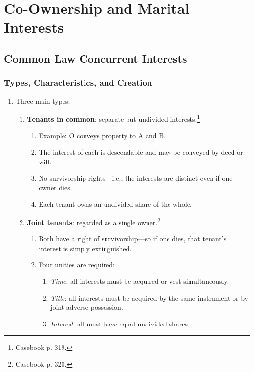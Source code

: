 \section{Co-Ownership and Marital Interests}

\subsection{Common Law Concurrent Interests}

\subsubsection{Types, Characteristics, and Creation}

\begin{enumerate}
    \item Three main types:
    \begin{enumerate}
        \item \textbf{Tenants in common}: separate but undivided 
        interests.\footnote{Casebook p. 319.}
        \begin{enumerate}
            \item Example: O conveys property to A and B.
            \item The interest of each is descendable and may be conveyed by 
            deed or will.
            \item No survivorship rights---i.e., the interests are distinct 
            even if one owner dies.
            \item Each tenant owns an undivided share of the whole.
        \end{enumerate}
        \item \textbf{Joint tenants}: regarded as a single 
        owner.\footnote{Casebook p. 320.}
        \begin{enumerate}
            \item Both have a right of survivorship---so if one dies, that 
            tenant's interest is simply extinguished.
            \item Four unities are required:
            \begin{enumerate}
                \item \emph{Time}: all interests must be acquired or vest 
                simultaneously.
                \item \emph{Title}: all interests must be acquired by the same 
                instrument or by joint adverse possession.
                \item \emph{Interest}: all must have equal undivided shares 

\end{enumerate}
\end{enumerate}
\end{enumerate}
\end{enumerate}
